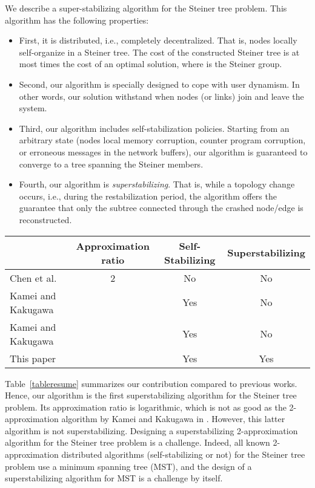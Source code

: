 \documentclass[11pt]{article}
\begin{document}
We describe a super-stabilizing algorithm for the Steiner tree problem. This algorithm has the following properties:
\begin{itemize}
\item First, it is distributed, i.e.,  completely decentralized. That is, nodes
locally self-organize in a Steiner tree. The cost of the constructed Steiner tree 
is at most  times the cost of an optimal solution, where  is the Steiner group. 
\item Second, our algorithm is specially designed to cope with user
dynamism. In other words, 
our solution withstand when nodes (or links) join and leave the system. 
\item Third, our algorithm includes self-stabilization policies. Starting from an arbitrary state (nodes local memory corruption, counter program corruption, or
erroneous messages in the network buffers), our algorithm is guaranteed to converge to a tree spanning the Steiner members. 
\item Fourth, our algorithm is \emph{superstabilizing}. That is, while
a topology change occurs, i.e., during the restabilization period,
 the algorithm offers the guarantee that only the subtree connected
through the crashed node/edge is reconstructed. 
\end{itemize}

\begin{table*}[!htb]
\begin{center}
\scalebox{1}
{
\begin{tabular}{|l|c|c|c|}
\hline
 & Approximation ratio & Self-Stabilizing & Superstabilizing \\
\hline
Chen et al. \cite{ChenHK93} & 2 & No & No \\
Kamei and Kakugawa \cite{SS_Steiner02} &  & Yes & No \\
Kamei and Kakugawa \cite{Kakugawa_Steiner_journal} &  & Yes & No \\
\hline
This paper &   & Yes & Yes \\
\hline
\end{tabular}
}
\caption{Distributed (deterministic) algorithms for the Steiner tree problem.}
\label{tableresume}
\end{center}
\end{table*}

Table~\ref{tableresume} summarizes our contribution compared to
previous works. Hence, our algorithm is the first superstabilizing
algorithm for the Steiner tree problem. Its approximation ratio is
logarithmic, which is not as good as the 2-approximation algorithm by
Kamei and Kakugawa in \cite{Kakugawa_Steiner_journal}. However, this
latter algorithm is not superstabilizing. Designing a superstabilizing
2-approximation algorithm for the Steiner tree problem is a
challenge. Indeed, all known 2-approximation distributed algorithms
(self-stabilizing or not) for the Steiner tree problem use a minimum
spanning tree (MST), and the design of a superstabilizing algorithm
for MST is a challenge by itself.
\end{document}
